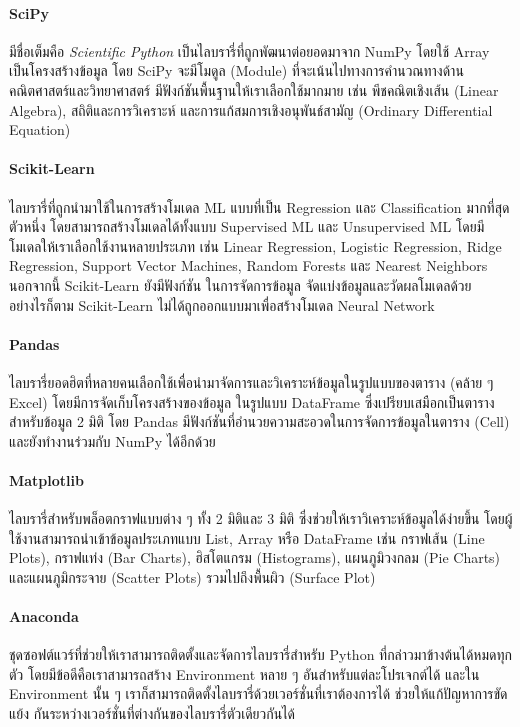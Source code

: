 \paragraph{SciPy} 
มีชื่อเต็มคือ \textit{Scientific Python} เป็นไลบรารี่ที่ถูกพัฒนาต่อยอดมาจาก NumPy โดยใช้ Array เป็นโครงสร้างข้อมูล
โดย SciPy จะมีโมดูล (Module) ที่จะเน้นไปทางการคำนวณทางด้านคณิตศาสตร์และวิทยาศาสตร์ มีฟังก์ชันพื้นฐานให้เราเลือกใช้มากมาย เช่น 
พีชคณิตเชิงเส้น (Linear Algebra), สถิติและการวิเคราะห์ และการแก้สมการเชิงอนุพันธ์สามัญ (Ordinary Differential Equation)

\paragraph{Scikit-Learn}
ไลบรารี่ที่ถูกนำมาใช้ในการสร้างโมเดล ML แบบที่เป็น Regression และ Classification มากที่สุดตัวหนึ่ง โดยสามารถสร้างโมเดลได้ทั้งแบบ 
Supervised ML และ Unsupervised ML โดยมีโมเดลให้เราเลือกใช้งานหลายประเภท เช่น Linear Regression, Logistic Regression, 
Ridge Regression, Support Vector Machines, Random Forests และ Nearest Neighbors นอกจากนี้ Scikit-Learn ยังมีฟังก์ชัน%
ในการจัดการข้อมูล จัดแบ่งข้อมูลและวัดผลโมเดลด้วย อย่างไรก็ตาม Scikit-Learn ไม่ได้ถูกออกแบบมาเพื่อสร้างโมเดล Neural Network

\paragraph{Pandas}
ไลบรารี่ยอดฮิตที่หลายคนเลือกใช้เพื่อนำมาจัดการและวิเคราะห์ข้อมูลในรูปแบบของตาราง (คล้าย ๆ Excel) โดยมีการจัดเก็บโครงสร้างของข้อมูล%
ในรูปแบบ DataFrame ซึ่งเปรียบเสมือกเป็นตารางสำหรับข้อมูล 2 มิติ โดย Pandas มีฟังก์ชันที่อำนวยความสะอวดในการจัดการข้อมูลในตาราง (Cell) 
และยังทำงานร่วมกับ NumPy ได้อีกด้วย

\paragraph{Matplotlib}
ไลบรารี่สำหรับพล็อตกราฟแบบต่าง ๆ ทั้ง 2 มิติและ 3 มิติ ซึ่งช่วยให้เราวิเคราะห์ข้อมูลได้ง่ายขึ้น โดยผู้ใช้งานสามารถนำเข้าข้อมูลประเภทแบบ 
List, Array หรือ DataFrame เช่น กราฟเส้น (Line Plots), กราฟแท่ง (Bar Charts), ฮิสโตแกรม (Histograms), แผนภูมิวงกลม 
(Pie Charts) และแผนภูมิกระจาย (Scatter Plots) รวมไปถึงพื้นผิว (Surface Plot)

\paragraph{Anaconda}
ชุดซอฟต์แวร์ที่ช่วยให้เราสามารถติดตั้งและจัดการไลบรารี่สำหรับ Python ที่กล่าวมาข้างต้นได้หมดทุกตัว โดยมีข้อดีคือเราสามารถสร้าง Environment 
หลาย ๆ อันสำหรับแต่ละโปรเจกต์ได้ และใน Environment นั้น ๆ เราก็สามารถติดตั้งไลบรารี่ด้วยเวอร์ชั่นที่เราต้องการได้ ช่วยให้แก้ปัญหาการขัดแย้ง%
กันระหว่างเวอร์ชั่นที่ต่างกันของไลบรารี่ตัวเดียวกันได้

